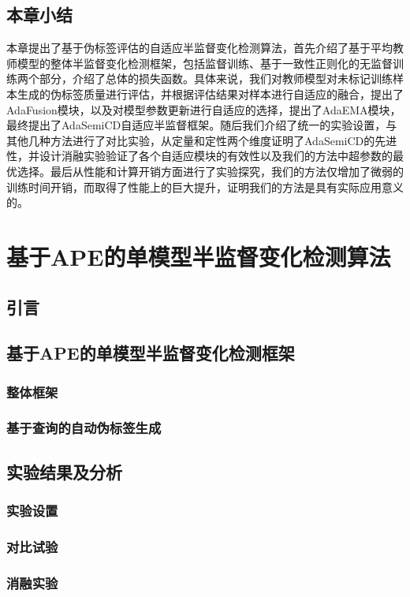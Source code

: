 \documentclass[lang=chs, degree=master, blindreview=false, adobe=false]{yanputhesis}
\begin{document}
\section{本章小结}
本章提出了基于伪标签评估的自适应半监督变化检测算法，首先介绍了基于平均教师模型的整体半监督变化检测框架，包括监督训练、基于一致性正则化的无监督训练两个部分，介绍了总体的损失函数。具体来说，我们对教师模型对未标记训练样本生成的伪标签质量进行评估，并根据评估结果对样本进行自适应的融合，提出了AdaFusion模块，以及对模型参数更新进行自适应的选择，提出了AdaEMA模块，最终提出了AdaSemiCD自适应半监督框架。随后我们介绍了统一的实验设置，与其他几种方法进行了对比实验，从定量和定性两个维度证明了AdaSemiCD的先进性，并设计消融实验验证了各个自适应模块的有效性以及我们的方法中超参数的最优选择。最后从性能和计算开销方面进行了实验探究，我们的方法仅增加了微弱的训练时间开销，而取得了性能上的巨大提升，证明我们的方法是具有实际应用意义的。


\chapter{基于APE的单模型半监督变化检测算法}
\section{引言}
\section{基于APE的单模型半监督变化检测框架}
\subsection{整体框架}
\subsection{基于查询的自动伪标签生成}
\section{实验结果及分析}
\subsection{实验设置}
\subsection{对比试验}
\subsection{消融实验}
\end{document}
